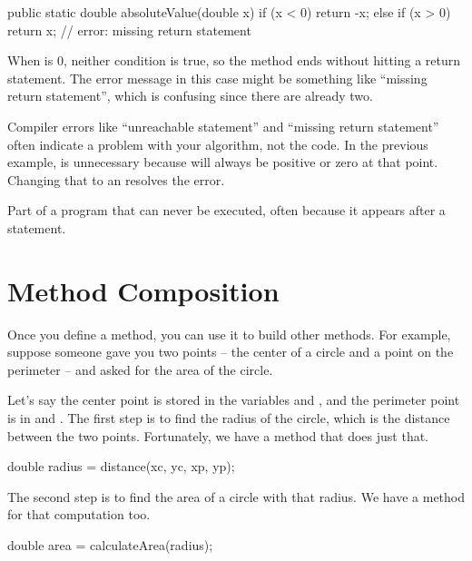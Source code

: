 \begin{code}
public static double absoluteValue(double x) {
    if (x < 0) {
        return -x;
    } else if (x > 0) {
        return x;
    }
    // error: missing return statement
}
\end{code}

When  is 0, neither condition is true, so the method ends without hitting a return statement.
The error message in this case might be something like ``missing return statement'', which is confusing since there are already two.

Compiler errors like ``unreachable statement'' and ``missing return statement'' often indicate a problem with your algorithm, not the code.
In the previous example,  is unnecessary because  will always be positive or zero at that point.
Changing that  to an  resolves the error.


\begin{description}

Part of a program that can never be executed, often because it appears after a  statement.

\end{description}


\section{Method Composition}


Once you define a method, you can use it to build other methods.
For example, suppose someone gave you two points -- the center of a circle and a point on the perimeter -- and asked for the area of the circle.

Let's say the center point is stored in the variables  and , and the perimeter point is in  and .
The first step is to find the radius of the circle, which is the distance between the two points.
Fortunately, we have a method that does just that.

\begin{code}
double radius = distance(xc, yc, xp, yp);
\end{code}

The second step is to find the area of a circle with that radius.
We have a method for that computation too.

\begin{code}
double area = calculateArea(radius);
\end{code}

